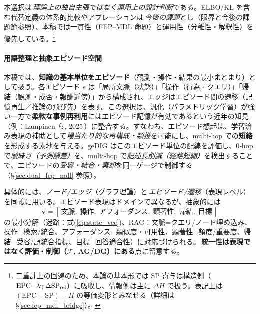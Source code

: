 \documentclass[ja=standard,xelatex]{bxjsarticle}
\newcommand{\F}{\mathcal{F}}
\begin{document}
本選択は\,\emph{理論上の独自主張ではなく運用上の設計判断}である。ELBO/KL を含む代替定義の体系的比較やアブレーションは\,\emph{今後の課題}とし（限界と今後の課題節参照）、本稿では一貫性（FEP–MDL 命題）と運用性（分離性・解釈性）を優先している。\footnote{二重計上の回避のため、本論の基本形では SP 寄与は構造側（$\mathrm{EPC}{-}\lambda\gamma\,\Delta\mathrm{SP}_{\rm rel}$）に吸収し、情報側は主に $\Delta H$ で扱う。表記上は $(\mathrm{EPC}{-}\mathrm{SP}){-}H$ の等価変形とみなせる（詳細は §\ref{sec:fep_mdl_bridge}）。}


\paragraph{用語整理と抽象エピソード空間}\label{sec:terms_episodes}
本稿では、\textbf{知識の基本単位をエピソード}（観測・操作・結果の最小まとまり）として扱う。各エピソード $e$ は「局所文脈（状態）」「操作（行為／クエリ）」「帰結（観測・成否・報酬近傍）」から構成され、エッジはエピソード間の遷移（記憶再生／推論の飛び先）を表す。この選択は、汎化（パラメトリック学習）が強い一方で\textbf{柔軟な事例再利用}にはエピソード記憶が有効であるという近年の知見（例：Lampinen ら, 2025\,\cite{Lampinen2025LatentLearning}）に整合する。すなわち、エピソード想起は、学習済み表現の補助として\emph{場当たり的な再構成・類推}を可能にし、multi‑hop での\textbf{短絡}を形成する素地を与える。geDIG はこのエピソード単位の配線を評価し、0‑hop で\emph{曖昧さ（予測誤差）}を、multi‑hop で\emph{記述長削減（経路短縮）}を検出することで、エピソードの\emph{受容・結合・棄却}を同一ゲージで制御する（\S\ref{sec:dual_fep_mdl} 参照）。

具体的には、\emph{ノード/エッジ}（グラフ理論）と\,\emph{エピソード/遷移}（表現レベル）を同義に用いる。エピソード表現はドメインで異なるが、抽象的には
\begin{equation}
  \mathbf{v} = [\,\text{文脈},\; \text{操作},\; \text{アフォーダンス},\; \text{顕著性},\; \text{帰結},\; \text{目標}\,]
\end{equation}
の最小分解（迷路：式(\ref{eq:state_vec})、RAG：文脈=クエリ/ノード埋め込み、操作=検索/統合、アフォーダンス=類似度・可用性、顕著性=頻度/重要度、帰結=受容/誤統合指標、目標=回答適合性）に対応づけられる。\,\textbf{統一性は表現ではなく評価・制御（$\F$, AG/DG）にある}点に留意する。
\end{document}
